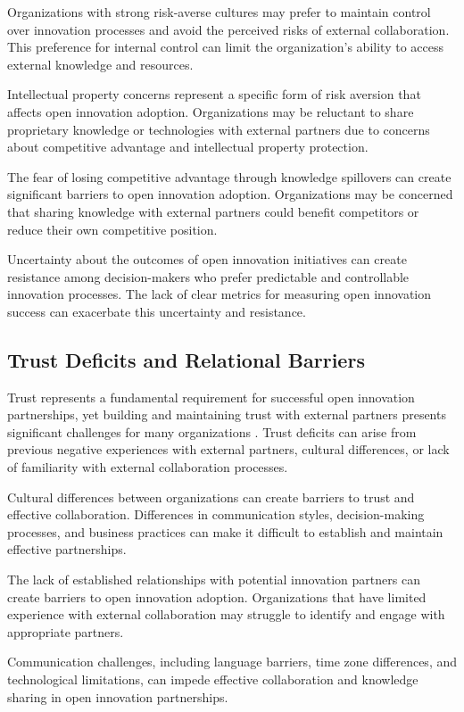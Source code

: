 \documentclass[12pt,a4paper]{article}
\begin{document}
Organizations with strong risk-averse cultures may prefer to maintain control over innovation processes and avoid the perceived risks of external collaboration. This preference for internal control can limit the organization's ability to access external knowledge and resources.

Intellectual property concerns represent a specific form of risk aversion that affects open innovation adoption. Organizations may be reluctant to share proprietary knowledge or technologies with external partners due to concerns about competitive advantage and intellectual property protection.

The fear of losing competitive advantage through knowledge spillovers can create significant barriers to open innovation adoption. Organizations may be concerned that sharing knowledge with external partners could benefit competitors or reduce their own competitive position.

Uncertainty about the outcomes of open innovation initiatives can create resistance among decision-makers who prefer predictable and controllable innovation processes. The lack of clear metrics for measuring open innovation success can exacerbate this uncertainty and resistance.

\subsection{Trust Deficits and Relational Barriers}

Trust represents a fundamental requirement for successful open innovation partnerships, yet building and maintaining trust with external partners presents significant challenges for many organizations \cite{laursen2012open}. Trust deficits can arise from previous negative experiences with external partners, cultural differences, or lack of familiarity with external collaboration processes.

Cultural differences between organizations can create barriers to trust and effective collaboration. Differences in communication styles, decision-making processes, and business practices can make it difficult to establish and maintain effective partnerships.

The lack of established relationships with potential innovation partners can create barriers to open innovation adoption. Organizations that have limited experience with external collaboration may struggle to identify and engage with appropriate partners.

Communication challenges, including language barriers, time zone differences, and technological limitations, can impede effective collaboration and knowledge sharing in open innovation partnerships.
\end{document}
